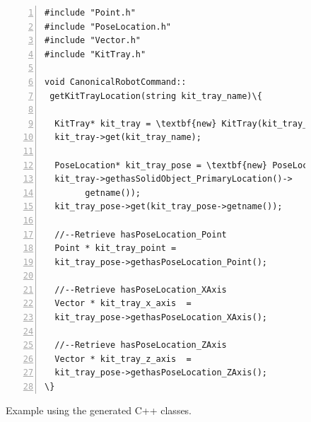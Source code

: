\begin{figure}[t!h!]
\begin{minipage}{.50\paperwidth}
\begin{mylisting}
\begin{Verbatim}[commandchars=\\\{\},fontsize=\scriptsize, numbers=left, numbersep=2pt]
#include "Point.h"
#include "PoseLocation.h"
#include "Vector.h"
#include "KitTray.h"

void CanonicalRobotCommand::
 getKitTrayLocation(string kit_tray_name)\{

  KitTray* kit_tray = \textbf{new} KitTray(kit_tray_name);
  kit_tray->get(kit_tray_name);

  PoseLocation* kit_tray_pose = \textbf{new} PoseLocation(
  kit_tray->gethasSolidObject_PrimaryLocation()->
 		getname());
  kit_tray_pose->get(kit_tray_pose->getname());

  //--Retrieve hasPoseLocation_Point
  Point * kit_tray_point =
  kit_tray_pose->gethasPoseLocation_Point();

  //--Retrieve hasPoseLocation_XAxis
  Vector * kit_tray_x_axis  =
  kit_tray_pose->gethasPoseLocation_XAxis();

  //--Retrieve hasPoseLocation_ZAxis
  Vector * kit_tray_z_axis  =
  kit_tray_pose->gethasPoseLocation_ZAxis();
\}
\end{Verbatim}
\end{mylisting}
\end{minipage}
\caption{Example using the generated C++ classes.}
\label{fig:exampleofuse}
\end{figure}


%
%
%
%
%
%

